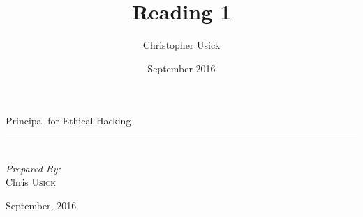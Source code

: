 \documentclass[11pt,british,fulltitle]{article}
\title{Reading 1}
\author{Christopher Usick }
\date{September 2016}
\newcommand{\HRule}{\rule{\linewidth}{0.5mm}}
\begin{document}
\begin{titlepage}
\vspace*{\fill}
\begin{center}
  {\huge Principal for Ethical Hacking \\[0.4cm]}
  \HRule \\[1.5cm]
  \emph{Prepared By:}\\
  Chris \textsc{Usick}\\

  \vfill

  {\large September, 2016}
\end{center}
\vspace*{\fill}
\end{titlepage}

\tableofcontents


\begin{singlespacing}
\newpage
\printbibliography
\end{singlespacing}
\end{document}
